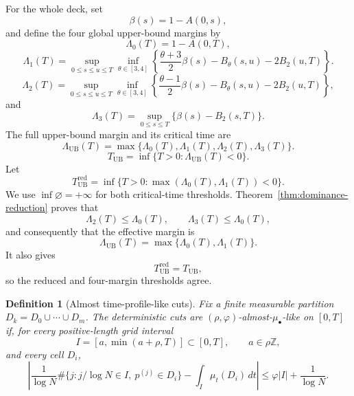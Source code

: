 \documentclass[11pt]{article}
\numberwithin{equation}{section}
\newtheorem{definition}[definition]{Definition}
\newcommand{\Z}{\mathbb Z}
\newcommand{\1}{\mathbf 1}
\newcommand{\UB}{\mathrm{UB}}
\begin{document}
For the whole deck, set
\begin{equation}
\label{eq:global-beta}
  \beta(s)=1-A(0,s),
\end{equation}
and define the four global upper-bound margins by
\begin{equation}
\label{eq:global-lambda-zero}
  \Lambda_0(T)=1-A(0,T),
\end{equation}
\begin{equation}
\label{eq:global-lambda-one}
  \Lambda_1(T)
  =\sup_{0\le s\le u\le T}\inf_{\theta\in[3,4]}
  \left\{\frac{\theta+3}{2}\beta(s)-B_\theta(s,u)-2B_2(u,T)\right\}.
\end{equation}
\begin{equation}
\label{eq:global-lambda-two}
  \Lambda_2(T)
  =\sup_{0\le s\le u\le T}\inf_{\theta\in[3,4]}
  \left\{\frac{\theta-1}{2}\beta(s)-B_\theta(s,u)-2B_2(u,T)\right\},
\end{equation}
and
\begin{equation}
\label{eq:global-lambda-three}
  \Lambda_3(T)=\sup_{0\le s\le T}\{\beta(s)-B_2(s,T)\}.
\end{equation}
The full upper-bound margin and its critical time are
\begin{equation}
\label{eq:global-upper-margin}
  \Lambda_{\UB}(T)=
  \max\{\Lambda_0(T),\Lambda_1(T),\Lambda_2(T),\Lambda_3(T)\}.
\end{equation}
\begin{equation}
\label{eq:full-upper-threshold}
  T_{\UB}=\inf\{T>0:\Lambda_{\UB}(T)<0\}.
\end{equation}
Let
\begin{equation}
\label{eq:reduced-upper-threshold}
  T_{\UB}^{\mathrm{red}}
  =\inf\{T>0:\max(\Lambda_0(T),\Lambda_1(T))<0\}.
\end{equation}
We use $\inf\varnothing=+\infty$ for both critical-time thresholds.
Theorem~\ref{thm:dominance-reduction} proves that
\[
  \Lambda_2(T)\le\Lambda_0(T),
  \qquad
  \Lambda_3(T)\le\Lambda_0(T),
\]
and consequently that the effective margin is
\[
  \Lambda_{\UB}(T)=\max\{\Lambda_0(T),\Lambda_1(T)\}.
\]
It also gives
\[
  T_{\UB}^{\mathrm{red}}=T_{\UB},
\]
so the reduced and four-margin thresholds agree.



\begin{definition}[Almost time-profile-like cuts]
\label{def:almost-time-profile-like-cuts}
Fix a finite measurable partition $D_k=D_0\cup\cdots\cup D_m$. The deterministic cuts are $(\rho,\varphi)$-almost-$\mu_\bullet$-like on $[0,T]$ if, for every positive-length grid interval
\[
  I=[a,\min(a+\rho,T)]\subset[0,T],
  \qquad a\in\rho\Z,
\]
and every cell $D_i$,
\[
  \left|
  \frac1{\log N}\#\{j:j/\log N\in I,\ p^{(j)}\in D_i\}
  -\int_I\mu_t(D_i)\,dt
  \right|\le \varphi |I|+\frac1{\log N}.
\]
\end{definition}
\end{document}

